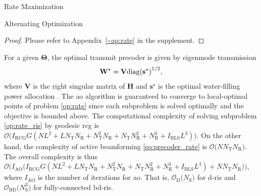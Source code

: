\documentclass[journal]{IEEEtran}
\begin{document}
\begin{section}{Rate Maximization}
\begin{subsection}{Alternating Optimization}
		\begin{proof}
			Please refer to Appendix~\ref{~ap:rate} in the supplement.
		\end{proof}
		For a given $\mathbf{\Theta}$, the optimal transmit precoder is given by eigenmode transmission \cite{Clerckx2013}
		\begin{equation}
			\label{eq:precoder_rate}
			\mathbf{W}^\star = \mathbf{V} {\operatorname{diag}(\mathbf{s}^\star)}^{1/2},
		\end{equation}
		where $\mathbf{V}$ is the right singular matrix of $\mathbf{H}$ and $\mathbf{s}^\star$ is the optimal water-filling power allocation \cite{Clerckx2013}.
		The \gls{ao} algorithm is guaranteed to converge to local-optimal points of problem \eqref{op:rate} since each subproblem is solved optimally and the objective is bounded above.
		The computational complexity of solving subproblem \eqref{op:rate_ris} by geodesic \gls{rcg} is $\mathcal{O}\bigl(I_\text{RCG} G (NL^2 + L N_\mathrm{T} N_\mathrm{R} + N_\mathrm{T}^2 N_\mathrm{R} + N_\mathrm{T} N_\mathrm{R}^2 + N_\mathrm{R}^3 + I_\text{BLS} L^3)\bigr)$.
		On the other hand, the complexity of active beamforming \eqref{eq:precoder_rate} is $\mathcal{O}\bigl(N N_\mathrm{T} N_\mathrm{R}\bigr)$.
		The overall complexity is thus $\mathcal{O}\bigl(I_\text{AO}\bigl(I_\text{RCG} G (NL^2 + L N_\mathrm{T} N_\mathrm{R} + N_\mathrm{T}^2 N_\mathrm{R} + N_\mathrm{T} N_\mathrm{R}^2 + N_\mathrm{R}^3 + I_\text{BLS} L^3) + N N_\mathrm{T} N_\mathrm{R}\bigr)\bigr)$, where $I_\text{AO}$ is the number of iterations for \gls{ao}.
		That is, $\mathcal{O}_\mathrm{D}\bigl(N_\mathrm{S}\bigr)$ for \gls{d}-\gls{ris} and $\mathcal{O}_\mathrm{BD}\bigl(N_\mathrm{S}^3\bigr)$ for fully-connected \gls{bd}-\gls{ris}.
	\end{subsection}


\end{section}
\end{document}
